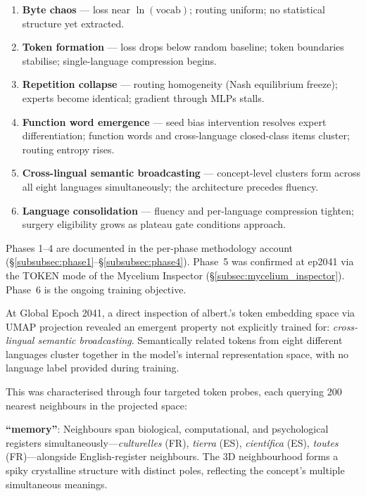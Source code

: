 \documentclass[11pt,a4paper]{article}
\begin{document}
\begin{enumerate}
  \item \textbf{Byte chaos} --- loss near $\ln(\text{vocab})$; routing uniform; no
        statistical structure yet extracted.
  \item \textbf{Token formation} --- loss drops below random baseline; token boundaries
        stabilise; single-language compression begins.
  \item \textbf{Repetition collapse} --- routing homogeneity (Nash equilibrium freeze);
        experts become identical; gradient through MLPs stalls.
  \item \textbf{Function word emergence} --- seed bias intervention resolves expert
        differentiation; function words and cross-language closed-class items cluster;
        routing entropy rises.
  \item \textbf{Cross-lingual semantic broadcasting} --- concept-level clusters form
        across all eight languages simultaneously; the architecture precedes fluency.
  \item \textbf{Language consolidation} --- fluency and per-language compression
        tighten; surgery eligibility grows as plateau gate conditions approach.
\end{enumerate}

Phases 1--4 are documented in the per-phase methodology account
(\S\ref{subsubsec:phase1}--\S\ref{subsubsec:phase4}). Phase~5 was
confirmed at ep2041 via the TOKEN mode of the Mycelium Inspector
(\S\ref{subsec:mycelium_inspector}). Phase~6 is the ongoing training
objective.

At Global Epoch 2041, a direct inspection of albert.'s token embedding space via UMAP
projection revealed an emergent property not explicitly trained for: \emph{cross-lingual
semantic broadcasting}. Semantically related tokens from eight different languages
cluster together in the model's internal representation space, with no language label
provided during training.

This was characterised through four targeted token probes, each querying 200 nearest
neighbours in the projected space:

\textbf{``memory''}: Neighbours span biological, computational, and psychological registers
simultaneously---\emph{culturelles} (FR), \emph{tierra} (ES), \emph{científica} (ES),
\emph{toutes} (FR)---alongside English-register neighbours. The 3D neighbourhood forms a
spiky crystalline structure with distinct poles, reflecting the concept's multiple
simultaneous meanings.
\end{document}
